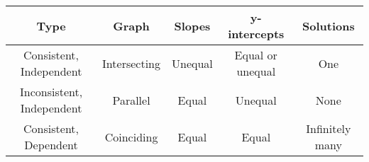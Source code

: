\vspace*{1ex} 

\noindent \begin{tabularx}{\textwidth}{*{5}{C}}
\hline

\hline
\textbf{Type} & \textbf{Graph} & \textbf{Slopes} & \textbf{y-intercepts} & \textbf{Solutions} \\
\hline 
Consistent, Independent & Intersecting & Unequal & Equal or unequal & One \\
\hline 
Inconsistent, Independent & Parallel  & Equal & Unequal & None \\
\hline 
Consistent, Dependent & Coinciding & Equal & Equal & Infinitely many \\
\hline 
\end{tabularx}  
